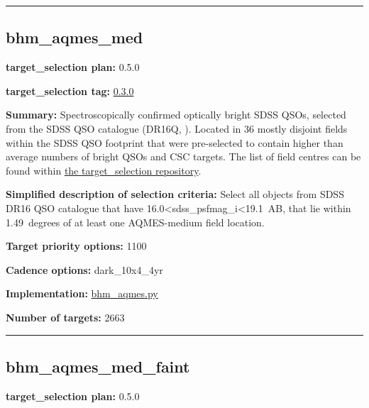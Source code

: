 \begin{center}\rule{0.5\linewidth}{0.5pt}\end{center}

\hypertarget{bhm_aqmes_med_plan0.5.0}{%
\subsection{bhm\_aqmes\_med}\label{bhm_aqmes_med_plan0.5.0}}

\noindent\textbf{target\_selection plan:} 0.5.0

\noindent\textbf{target\_selection tag:}
\href{https://github.com/sdss/target_selection/tree/0.3.0/}{0.3.0}

\noindent\textbf{Summary:} Spectroscopically confirmed optically bright SDSS
QSOs, selected from the SDSS QSO catalogue (DR16Q,
\citealt{Lyke2020}). Located in 36 mostly disjoint fields within the SDSS QSO
footprint that were pre-selected to contain higher than average numbers
of bright QSOs and CSC targets. The list of field centres can be found
within
\href{https://github.com/sdss/target_selection/blob/0.3.0/python/target_selection/masks/candidate_target_fields_bhm_aqmes_med_v0.3.1.fits}{the
target\_selection repository}.

\noindent\textbf{Simplified description of selection criteria:} Select all
objects from SDSS DR16 QSO catalogue that have
16.0\textless sdss\_psfmag\_i\textless19.1~AB, that lie within
1.49~degrees of at least one AQMES-medium field location.


\noindent\textbf{Target priority options:} 1100

\noindent\textbf{Cadence options:} dark\_10x4\_4yr

\noindent\textbf{Implementation:}
\href{https://github.com/sdss/target_selection/blob/0.3.0/python/target_selection/cartons/bhm_aqmes.py}{bhm\_aqmes.py}

\noindent\textbf{Number of targets:} 2663

\begin{center}\rule{0.5\linewidth}{0.5pt}\end{center}

\hypertarget{bhm_aqmes_med_faint_plan0.5.0}{%
\subsection{bhm\_aqmes\_med\_faint}\label{bhm_aqmes_med_faint_plan0.5.0}}

\noindent\textbf{target\_selection plan:} 0.5.0

